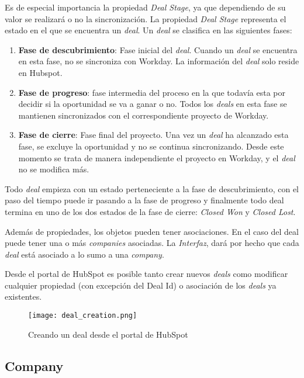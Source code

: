 		
		Es de especial importancia la propiedad \textit{Deal Stage}, ya que dependiendo de su valor se realizará o no la sincronización.
		La propiedad \textit{Deal Stage} representa el estado en el que se encuentra un \textit{deal}. Un \textit{deal} se clasifica en las siguientes fases:
		\begin{enumerate}
			\item \textbf{Fase de descubrimiento}: Fase inicial del \textit{deal}. Cuando un \textit{deal} se encuentra en esta fase, no se sincroniza con Workday. La información del \textit{deal} solo reside en Hubspot.
			\item \textbf{Fase de progreso}: fase intermedia del proceso en la que todavía esta por decidir si la oportunidad se va a ganar o no. Todos los \textit{deals} en esta fase se mantienen sincronizados con el correspondiente proyecto de Workday.
			\item \textbf{Fase de cierre}: Fase final del proyecto. Una vez un \textit{deal} ha alcanzado esta fase, se excluye la oportunidad y no se continua sincronizando. Desde este momento se trata de manera independiente el proyecto en Workday, y el \textit{deal} no se modifica más. 
		\end{enumerate}
		
		
		
		Todo \textit{deal} empieza con un estado perteneciente a la fase de descubrimiento, con el paso del tiempo puede ir pasando a la fase de progreso y finalmente todo deal termina en uno de los dos estados de la fase de cierre: \textit{Closed Won} y \textit{Closed Lost}.
			
			
			
		Además de propiedades, los objetos pueden tener asociaciones. En el caso del deal puede tener una o más \textit{companies} asociadas. La \textit{Interfaz}, dará por hecho que cada \textit{deal} está asociado a lo sumo a una \textit{company}.
			
		Desde el portal de HubSpot es posible tanto crear nuevos \textit{deals} como modificar cualquier propiedad (con excepción del Deal Id) o asociación de los \textit{deals} ya existentes.
		
		\begin{figure}
			\centering
			\texttt{[image: deal\_creation.png]}
			\caption{Creando un deal desde el portal de HubSpot}
		\end{figure}

\subsection{Company}
		
